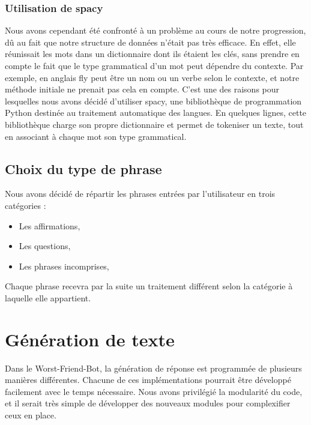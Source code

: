 \documentclass[paper=a4, fontsize=11pt]{article}
\begin{document}
\subsubsection{Utilisation de spacy}
Nous avons cependant été confronté à un problème au cours de notre progression, dû au fait que notre structure de données n'était pas très efficace. En effet, elle réunissait les mots dans un dictionnaire dont ils étaient les clés, sans prendre en compte le fait que le type grammatical d'un mot peut dépendre du contexte. Par exemple, en anglais \og fly \fg{} peut être un nom ou un verbe selon le contexte, et notre méthode initiale ne prenait pas cela en compte. C'est une des raisons pour lesquelles nous avons décidé d'utiliser spacy, une bibliothèque de programmation Python destinée au traitement automatique des langues. En quelques lignes, cette bibliothèque charge son propre dictionnaire et permet de tokeniser un texte, tout en associant à chaque mot son type grammatical.


\subsection{Choix du type de phrase}
Nous avons décidé de répartir les phrases entrées par l'utilisateur en trois catégories :
\begin{itemize}
\item Les affirmations,
\item Les questions,
\item Les phrases incomprises,
\end{itemize}
Chaque phrase recevra par la suite un traitement différent selon la catégorie à laquelle elle appartient.
	
	
\section{Génération de texte}
Dans le Worst-Friend-Bot, la génération de réponse est programmée de plusieurs manières différentes. Chacune de ces implémentations  pourrait être développé facilement avec le temps nécessaire. Nous avons privilégié la modularité du code, et il serait très simple de développer des nouveaux modules pour complexifier ceux en place.
\end{document}

